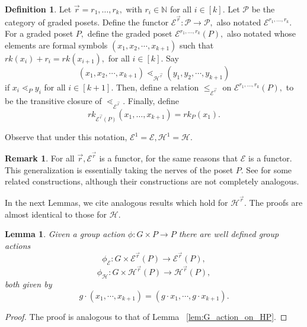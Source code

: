 \documentclass[10 pt]{amsart}
\theoremstyle{plain}
\newtheorem{lem}[thm]{Lemma}
\theoremstyle{definition}
\newtheorem{defn}[thm]{Definition}
\newtheorem{rem}[thm]{Remark}
\theoremstyle{remark}
\numberwithin{equation}{section}
\newcommand\BN{{\mathbb N}}
\renewcommand{\vec}[1]{\overrightarrow{#1}}
\begin{document}
\begin{defn}
Let $\vec r = r_1,\ldots,r_k,$ with $r_i \in \BN$ for all $i \in [k].$ Let $\mathcal P$ be the category of graded posets. Define the functor $\mathcal E^{\vec r}:\mathcal P \rightarrow \mathcal P,$ also notated $\mathcal E^{r_1,\ldots, r_k}.$ For a graded poset $P,$ define the graded poset $\mathcal E^{r_1,\ldots, r_k}(P),$ also notated whose elements are formal symbols $(x_1, x_2, \cdots, x_{k+1})$ such that $rk(x_i)+r_i = rk(x_{i+1}),$ for all $i \in [k].$ Say 
$$(x_1, x_2, \cdots, x_{k+1})\lessdot_{\mathcal H^{\vec r}} (y_1, y_2, \cdots , y_{k+1})$$ if $x_i \lessdot_P y_i$ for all $i \in [k+1]$. Then, define a relation $\leq_{\mathcal E^{\vec r}}$ on $\mathcal E^{r_1,\ldots, r_k}(P),$ to be the transitive closure of $\lessdot_{\mathcal E^{\vec r}}.$ Finally, define 
$$rk_{\mathcal E^{\vec r}(P)}(x_1,\ldots, x_{k+1}) = rk_P(x_1).$$
\end{defn}

Observe that under this notation, $\mathcal E^1 = \mathcal E, \mathcal H^1 = \mathcal H.$

\begin{rem}
For all $\vec r,\mathcal E^{\vec r}$ is a functor, for the same reasons that $\mathcal E$ is a functor. This generalization is essentially taking the nerves of the poset $P.$ See \cite{babson} for some related constructions, although their constructions are not completely analogous.
\end{rem}

In the next Lemmas, we cite analogous results which hold for $\mathcal H^{\vec r}.$ The proofs are almost identical to those for $\mathcal H.$

\begin{lem}
Given a group action $\phi:G \times P \rightarrow P$ there are well defined group actions 
$$\phi_{\mathcal E}:G\times \mathcal E^{\vec r}(P) \rightarrow \mathcal E^{\vec r}(P),$$
$$\phi_{\mathcal H}:G\times \mathcal H^{\vec r}(P) \rightarrow \mathcal H^{\vec r}(P),$$ 
both given by 
$$g \cdot (x_1, \cdots, x_{k+1}) =(g\cdot x_1, \cdots, g \cdot x_{k+1}).$$
\end{lem}
\begin{proof}
The proof is analogous to that of Lemma ~\ref{lem:G_action_on_HP}.
\end{proof}
\end{document}
